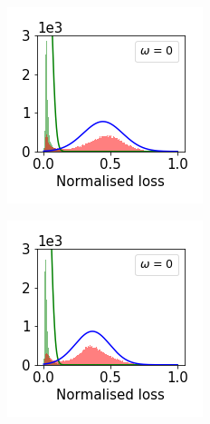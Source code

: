 \documentclass[11pt]{article}
\begin{document}
\begin{figure}[t]
\begin{subfigure}{.18\textwidth}
  \end{subfigure}
  \begin{subfigure}{.18\textwidth}
    \centering
    \includegraphics[width=\linewidth]{images/loss_dist/DM_0.6_1.00_cifar100.png} 
  \end{subfigure}
  \begin{subfigure}{.18\textwidth}
    \centering
    \includegraphics[width=\linewidth]{images/loss_dist/DM_0.6_1.00_imagenet32.png} 

\end{subfigure}
\end{figure}
\end{document}
